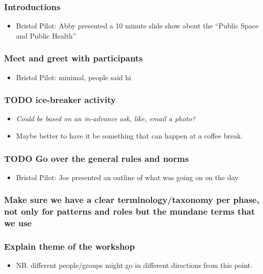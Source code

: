 \documentclass{article}
\begin{document}
\subsubsection{Introductions}
\begin{itemize}
\item Bristol Pilot: Abby presented a 10 minute slide show about the ``Public Space and Public Health''
\end{itemize}
\subsubsection{Meet and greet with participants}
\begin{itemize}
\item Bristol Pilot: minimal, people said hi
\end{itemize}
\subsubsection{{\bfseries\sffamily TODO} ice-breaker activity}
\begin{itemize}
\item \emph{Could be based on an in-advance ask, like, email a photo?}
\item Maybe better to have it be something that can happen at a coffee break.
\end{itemize}
\subsubsection{{\bfseries\sffamily TODO} Go over the general rules and norms}
\begin{itemize}
\item Bristol Pilot: Joe presented an outline of what was going on on the day
\end{itemize}
\subsubsection{Make sure we have a clear terminology/taxonomy per phase, not only for patterns and roles but the mundane terms that we use}
\subsubsection{Explain theme of the workshop}
\begin{itemize}
\item NB. different people/groups might go in different directions from this point.
\end{itemize}
\end{document}
